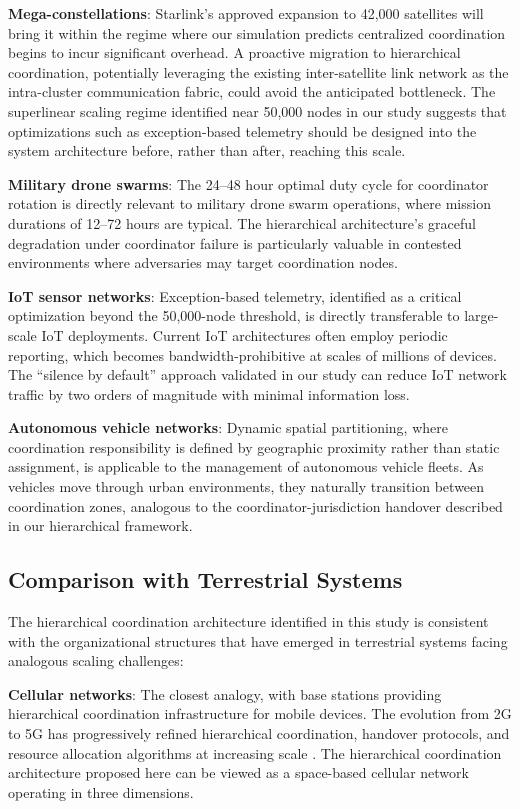\documentclass[journal]{IEEEtran}
\begin{document}
\textbf{Mega-constellations}: Starlink's approved expansion to 42{,}000 satellites will bring it within the regime where our simulation predicts centralized coordination begins to incur significant overhead. A proactive migration to hierarchical coordination, potentially leveraging the existing inter-satellite link network as the intra-cluster communication fabric, could avoid the anticipated bottleneck. The superlinear scaling regime identified near 50{,}000 nodes in our study suggests that optimizations such as exception-based telemetry should be designed into the system architecture before, rather than after, reaching this scale.

\textbf{Military drone swarms}: The 24--48 hour optimal duty cycle for coordinator rotation is directly relevant to military drone swarm operations, where mission durations of 12--72 hours are typical. The hierarchical architecture's graceful degradation under coordinator failure is particularly valuable in contested environments where adversaries may target coordination nodes.

\textbf{IoT sensor networks}: Exception-based telemetry, identified as a critical optimization beyond the 50{,}000-node threshold, is directly transferable to large-scale IoT deployments. Current IoT architectures often employ periodic reporting, which becomes bandwidth-prohibitive at scales of millions of devices. The ``silence by default'' approach validated in our study can reduce IoT network traffic by two orders of magnitude with minimal information loss.

\textbf{Autonomous vehicle networks}: Dynamic spatial partitioning, where coordination responsibility is defined by geographic proximity rather than static assignment, is applicable to the management of autonomous vehicle fleets. As vehicles move through urban environments, they naturally transition between coordination zones, analogous to the coordinator-jurisdiction handover described in our hierarchical framework.

\subsection{Comparison with Terrestrial Systems}

The hierarchical coordination architecture identified in this study is consistent with the organizational structures that have emerged in terrestrial systems facing analogous scaling challenges:

\textbf{Cellular networks}: The closest analogy, with base stations providing hierarchical coordination infrastructure for mobile devices. The evolution from 2G to 5G has progressively refined hierarchical coordination, handover protocols, and resource allocation algorithms at increasing scale \cite{rappaport_wireless}. The hierarchical coordination architecture proposed here can be viewed as a space-based cellular network operating in three dimensions.
\end{document}
